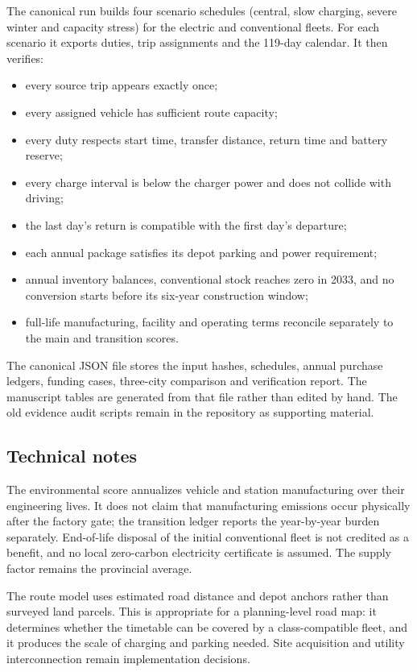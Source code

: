 \documentclass[12pt,letterpaper]{article}
\begin{document}
The canonical run builds four scenario schedules (central, slow charging, severe winter and capacity stress) for the electric and conventional fleets. For each scenario it exports duties, trip assignments and the 119-day calendar. It then verifies:
\begin{itemize}
\item every source trip appears exactly once;
\item every assigned vehicle has sufficient route capacity;
\item every duty respects start time, transfer distance, return time and battery reserve;
\item every charge interval is below the charger power and does not collide with driving;
\item the last day's return is compatible with the first day's departure;
\item each annual package satisfies its depot parking and power requirement;
\item annual inventory balances, conventional stock reaches zero in 2033, and no conversion starts before its six-year construction window;
\item full-life manufacturing, facility and operating terms reconcile separately to the main and transition scores.
\end{itemize}

The canonical JSON file stores the input hashes, schedules, annual purchase ledgers, funding cases, three-city comparison and verification report. The manuscript tables are generated from that file rather than edited by hand. The old evidence audit scripts remain in the repository as supporting material.

\subsection{Technical notes}

The environmental score annualizes vehicle and station manufacturing over their engineering lives. It does not claim that manufacturing emissions occur physically after the factory gate; the transition ledger reports the year-by-year burden separately. End-of-life disposal of the initial conventional fleet is not credited as a benefit, and no local zero-carbon electricity certificate is assumed. The supply factor remains the provincial average.

The route model uses estimated road distance and depot anchors rather than surveyed land parcels. This is appropriate for a planning-level road map: it determines whether the timetable can be covered by a class-compatible fleet, and it produces the scale of charging and parking needed. Site acquisition and utility interconnection remain implementation decisions.
\end{document}
